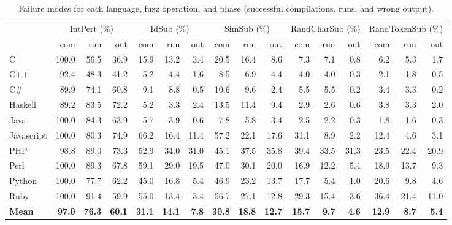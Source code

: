 \documentclass[10pt]{sigplanconf}
\begin{document}
\begin{table}
\begin{center}
\begin{tabular}{ l r r r|r r r|r r r|r r r|r r r}
& \multicolumn{3}{c}{IntPert (\%)} & \multicolumn{3}{c}{IdSub (\%)} & \multicolumn{3}{c}{SimSub (\%)} & \multicolumn{3}{c}{RandCharSub (\%)} & \multicolumn{3}{c}{RandTokenSub (\%)}\\ 
	       & com  & run  & out  & com  & run  & out  & com  & run  & out  & com & run   & out  & com  & run  & out\\
\hline													
C & 100.0 & 56.5 & 36.9  & 15.9 & 13.2 & 3.4  & 20.5 & 16.4 & 8.6  & 7.3 & 7.1 & 0.8  & 6.2 & 5.3 & 1.7 \\
C++ & 92.4 & 48.3 & 41.2  & 5.2 & 4.4 & 1.6  & 8.5 & 6.9 & 4.4  & 4.0 & 4.0 & 0.3  & 2.1 & 1.8 & 0.5 \\
C\# & 89.9 & 74.1 & 60.8  & 9.1 & 8.8 & 0.5  & 10.6 & 9.6 & 2.4  & 5.5 & 5.5 & 0.2  & 3.4 & 3.3 & 0.2 \\
Haskell & 89.2 & 83.5 & 72.2  & 5.2 & 3.3 & 2.4  & 13.5 & 11.4 & 9.4  & 2.9 & 2.6 & 0.6  & 3.8 & 3.3 & 2.0 \\
Java & 100.0 & 84.3 & 63.9  & 5.7 & 3.9 & 0.6  & 7.8 & 5.8 & 3.4  & 2.5 & 2.2 & 0.3  & 1.8 & 1.6 & 0.3 \\
Javascript & 100.0 & 80.3 & 74.9  & 66.2 & 16.4 & 11.4  & 57.2 & 22.1 & 17.6  & 31.1 & 8.9 & 2.2  & 12.4 & 4.6 & 3.1 \\
PHP & 98.8 & 89.0 & 73.3  & 52.9 & 34.0 & 31.0  & 45.1 & 37.5 & 35.8  & 39.4 & 33.5 & 31.3  & 23.5 & 22.4 & 20.9 \\
Perl & 100.0 & 89.3 & 67.8  & 59.1 & 29.0 & 19.5  & 47.0 & 30.1 & 20.0  & 16.9 & 12.2 & 5.4  & 18.9 & 13.7 & 9.3 \\
Python & 100.0 & 77.7 & 62.2  & 45.0 & 16.8 & 5.4  & 46.9 & 23.2 & 13.7  & 17.7 & 5.4 & 1.0  & 20.6 & 9.8 & 4.6 \\
Ruby & 100.0 & 91.4 & 59.9  & 55.0 & 13.4 & 3.4  & 56.7 & 27.1 & 12.8  & 29.3 & 15.4 & 3.6  & 36.4 & 21.4 & 11.0 \\
\textbf{Mean} & \textbf{97.0} & \textbf{76.3} & \textbf{60.1}  & \textbf{31.1} & \textbf{14.1} & \textbf{7.8}  & \textbf{30.8} & \textbf{18.8} & \textbf{12.7}  & \textbf{15.7} & \textbf{9.7} & \textbf{4.6}  & \textbf{12.9} & \textbf{8.7} & \textbf{5.4} \\
\end{tabular}
\end{center}
\caption{Failure modes for each language, fuzz operation, and phase (successful compilations, runs, and wrong output).}
\label{tbl:aggregated-per-language}
\end{table}
\end{document}
